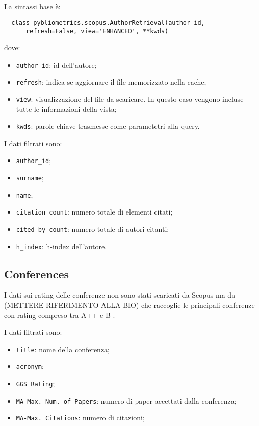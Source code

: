 La sintassi base è:
\begin{lstlisting}
  class pybliometrics.scopus.AuthorRetrieval(author_id, 
      refresh=False, view='ENHANCED', **kwds)
\end{lstlisting}

dove:
\begin{itemize}
  \item \texttt{author\_id}: id dell'autore;
  \item \texttt{refresh}: indica se aggiornare il file memorizzato nella cache;
  \item \texttt{view}: visualizzazione del file da scaricare. In questo caso vengono incluse tutte le informazioni della vista;
  \item \texttt{kwds}: parole chiave trasmesse come parametetri alla query.
\end{itemize}

I dati filtrati sono:
\begin{itemize}
  \item \texttt{author\_id};
  \item \texttt{surname};
  \item \texttt{name};
  \item \texttt{citation\_count}: numero totale di elementi citati;
  \item \texttt{cited\_by\_count}: numero totale di autori citanti;
  \item \texttt{h\_index}: h-index dell'autore.
\end{itemize}

\subsection{Conferences}
I dati sui rating delle conferenze non sono stati scaricati da Scopus ma da (METTERE RIFERIMENTO ALLA BIO) che raccoglie le principali conferenze con rating compreso
tra A++ e B-.

I dati filtrati sono:
\begin{itemize}
  \item \texttt{title}: nome della conferenza;
  \item \texttt{acronym};
  \item \texttt{GGS Rating};
  \item \texttt{MA-Max. Num. of Papers}: numero di paper accettati dalla conferenza;
  \item \texttt{MA-Max. Citations}: numero di citazioni;
\end{itemize}

